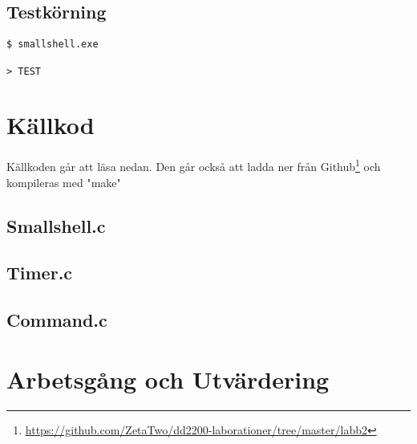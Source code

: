 \documentclass[10pt,a4paper]{article}
\begin{document}

\subsection{Testkörning}

\begin{lstlisting}
$ smallshell.exe

> TEST
\end{lstlisting}


\clearpage
\section{Källkod}
Källkoden går att läsa nedan. Den går också att ladda ner från Github\footnote{\url{https://github.com/ZetaTwo/dd2200-laborationer/tree/master/labb2}} och kompileras med "make"

\subsection{Smallshell.c}

\subsection{Timer.c}

\subsection{Command.c}

\clearpage

\section{Arbetsgång och Utvärdering}
\end{document}
